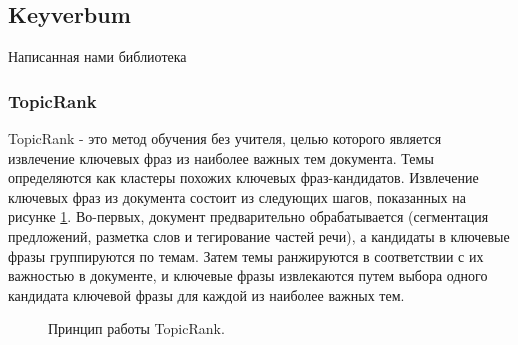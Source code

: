 \documentclass[14pt]{matmex-diploma-custom}
\begin{document}
\subsection{Keyverbum}
Написанная нами библиотека


\subsubsection{TopicRank}
TopicRank - это метод обучения без учителя, целью которого является извлечение ключевых фраз из наиболее важных тем документа. Темы определяются как кластеры похожих ключевых фраз-кандидатов. Извлечение ключевых фраз из документа состоит из следующих шагов, показанных на рисунке \ref{topicrank}. Во-первых, документ предварительно обрабатывается (сегментация предложений, разметка слов и тегирование частей речи), а кандидаты в ключевые фразы группируются по темам. Затем темы ранжируются в соответствии с их важностью в документе, и ключевые фразы извлекаются путем выбора одного кандидата ключевой фразы для каждой из наиболее важных тем.

\begin{figure}[ht]
\begin{center}


\caption{
\label{topicrank}
        Принцип работы TopicRank.}
\end {center}
\end {figure}
\end{document}

